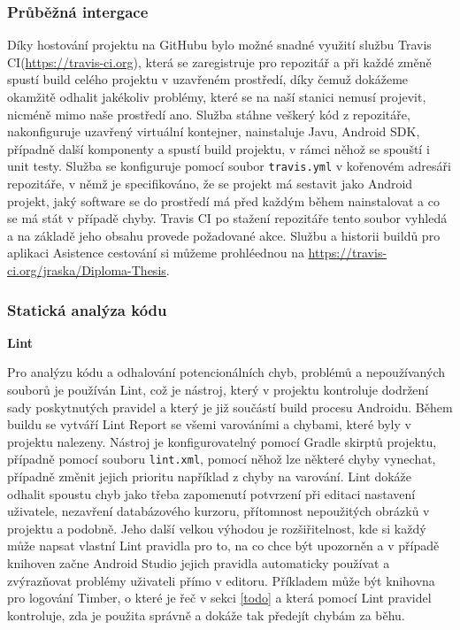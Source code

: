\documentclass{article}
\begin{document}
 \subsubsection{Průběžná intergace}
 Díky hostování projektu na GitHubu bylo možné snadné využití službu Travis CI(\url{https://travis-ci.org}),
 která se zaregistruje pro repozitář
 a při každé změně spustí build celého projektu v uzavřeném prostředí, díky čemuž dokážeme okamžitě
 odhalit jakékoliv problémy, které se na naší stanici nemusí projevit, nicméně mimo naše prostředí ano.
 Služba stáhne veškerý kód z repozitáře, nakonfiguruje uzavřený virtuální kontejner, nainstaluje Javu, Android SDK,
 případně další komponenty a spustí build projektu, v rámci něhož se spouští i unit testy. Služba se konfiguruje pomocí
 soubor \texttt{travis.yml} v kořenovém adresáři repozitáře, v němž je specifikováno, že se projekt má sestavit jako Android projekt,
 jaký software se do prostředí má před každým během nainstalovat a co se má stát v případě chyby. Travis CI po stažení
 repozitáře tento soubor vyhledá a na základě jeho obsahu provede požadované akce.
 Službu a historii buildů pro aplikaci Asistence cestování si můžeme prohléednou na \url{https://travis-ci.org/jraska/Diploma-Thesis}.

 \subsubsection{Statická analýza kódu}

\noindent
 \textbf{Lint}


 Pro analýzu kódu a odhalování potencionálních chyb, problémů a nepoužívaných souborů je používán Lint,
  což je nástroj, který v projektu kontroluje dodržení sady poskytnutých pravidel a který
  je již součástí build procesu Androidu. Během buildu se vytváří Lint Report
  se všemi varováními a chybami, které byly v projektu nalezeny. Nástroj je konfigurovatelný pomocí
  Gradle skirptů projektu, případně pomocí souboru \texttt{lint.xml}, pomocí něhož lze některé chyby
  vynechat, případně změnit jejich prioritu například z chyby na varování.
  Lint dokáže odhalit spoustu chyb jako třeba zapomenutí potvrzení při editaci nastavení uživatele,
  nezavření databázového kurzoru, přítomnost nepoužitých obrázků v projektu a podobně.
  Jeho další velkou výhodou je rozšiřitelnost, kde si každý může napsat vlastní Lint pravidla pro to, na co chce být upozorněn
  a v případě knihoven začne Android Studio jejich pravidla automaticky používat a zvýrazňovat problémy uživateli
  přímo v editoru.
  Příkladem může být knihovna pro logování Timber, o které je řeč v sekci \ref{todo} a která pomocí Lint pravidel
  kontroluje, zda je použita správně a dokáže tak předejít chybám za běhu.
\end{document}
